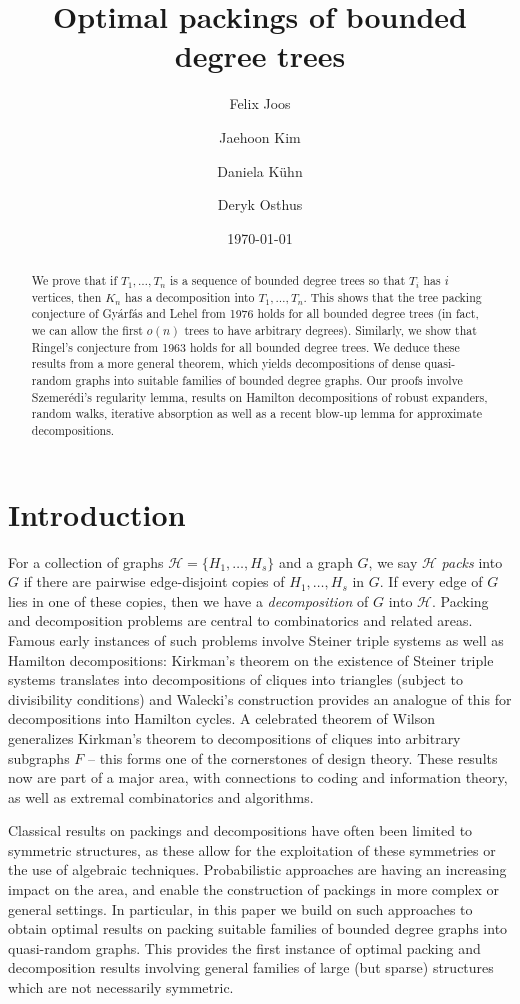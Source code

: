 \documentclass[a4paper, 11pt, reqno]{amsart}
\title{Optimal packings of bounded degree trees}
\author{Felix Joos}
\author{Jaehoon Kim}
\author{Daniela K\"uhn}
\author{Deryk Osthus}
\date{\today}
\numberwithin{equation}{section}
\newcommand{\1}{{\rm 1\hspace*{-0.4ex}%
\rule{0.1ex}{1.52ex}\hspace*{0.2ex}}}
\newcommand{\cH}{\mathcal{H}}
\begin{document}
\begin{abstract}
We prove that if $T_1,\dots, T_n$ is a sequence of bounded degree trees so that $T_i$ has $i$ vertices, then $K_n$ has a decomposition into $T_1,\dots, T_n$. This shows that the tree packing conjecture of Gy\'arf\'as and Lehel from 1976 holds for all bounded degree trees 
(in fact, we can allow the first $o(n)$ trees to have arbitrary degrees). 
Similarly, we show that Ringel's conjecture from 1963 holds for all bounded degree trees.
We deduce these results from a more general theorem, which yields decompositions of dense quasi-random graphs into suitable families of bounded degree graphs. 
Our proofs involve Szemer\'{e}di's regularity lemma, results on Hamilton decompositions of robust expanders, random walks,
iterative absorption as well as a recent blow-up lemma for approximate decompositions.
\end{abstract}
\maketitle


\section{Introduction}
For a collection of graphs $\cH=\{H_1,\ldots,H_s\}$ and a graph $G$,
we say $\cH$ \emph{packs} into $G$ if there are pairwise edge-disjoint copies of $H_1,\dots, H_s$ in $G$. If every edge of $G$ lies in one of these copies, then we have a {\em decomposition} of $G$ into $\cH$. Packing and decomposition problems are central to combinatorics and related areas. 
Famous early instances of such problems involve Steiner triple systems as well as Hamilton decompositions:
Kirkman's theorem on the existence of Steiner triple systems translates into decompositions of cliques into triangles
(subject to divisibility conditions) and Walecki's construction provides an analogue of this for decompositions into Hamilton cycles.
A celebrated theorem of Wilson~\cite{wilson1,wilson2,wilson3} generalizes Kirkman's theorem to decompositions of cliques into arbitrary subgraphs $F$
-- this forms one of the cornerstones of design theory. These results now are part of a major area, with connections to coding and information theory, as well as extremal combinatorics
and algorithms.

Classical results on packings and decompositions have often been limited to symmetric structures, 
as these allow for the exploitation of these symmetries or the use of algebraic techniques. 
Probabilistic approaches are having an increasing impact on the area, and enable the construction of packings in more complex or general settings.
In particular, in this paper we build on such approaches to obtain optimal results on packing suitable families of bounded degree graphs into quasi-random graphs. This provides the first instance of optimal packing and decomposition results involving general families of
large (but sparse) structures which are not necessarily symmetric.
\end{document}
